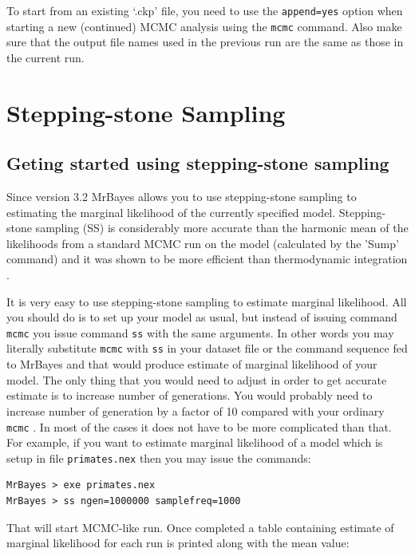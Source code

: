 \documentclass[12pt]{book}
\newcommand{\ttt}[1]{\texttt{#1} }
\begin{document}
To start from an existing `.ckp' file, you need to use the \ttt{append=yes} option when starting
a new (continued) MCMC analysis using the \ttt{mcmc} command. Also make sure that the output file 
names used in the previous run are the same as those in the current run.



\section{Stepping-stone Sampling}


\subsection{Geting started using stepping-stone sampling}
Since version 3.2 MrBayes allows you to use stepping-stone sampling \citep{xie11} to estimating the
marginal likelihood of the currently specified model. Stepping-stone sampling (SS) is considerably
more accurate than the harmonic mean of the likelihoods from a standard MCMC run on the model
(calculated by the 'Sump' command) and it was shown to be more efficient than thermodynamic
integration \citep{xie11}. 

It is very easy to use stepping-stone sampling to estimate marginal likelihood. All you should do
is to set up your model as usual, but instead of issuing command \ttt{mcmc} you issue command
\ttt{ss} with the same arguments. In other words you may literally substitute \ttt{mcmc} with
\ttt{ss} in your dataset file or the command sequence fed to MrBayes and that would produce
estimate of marginal likelihood of your model. The only thing that you would need to adjust in
order to get accurate estimate is to increase number of generations. You would probably need to
increase number of generation by a factor of 10 compared with your ordinary \ttt{mcmc}.  In most of
the cases it does not have to be more complicated than that. For example, if you want to estimate
marginal likelihood of a model which is setup in file \ttt{primates.nex} then you may issue the
commands:

\begin{singlespacing}
\begin{verbatim}
MrBayes > exe primates.nex
MrBayes > ss ngen=1000000 samplefreq=1000
\end{verbatim}
\end{singlespacing}

That will start MCMC-like run. Once completed a table containing estimate of marginal likelihood
for each run is printed along with the mean value: 
\end{document}
